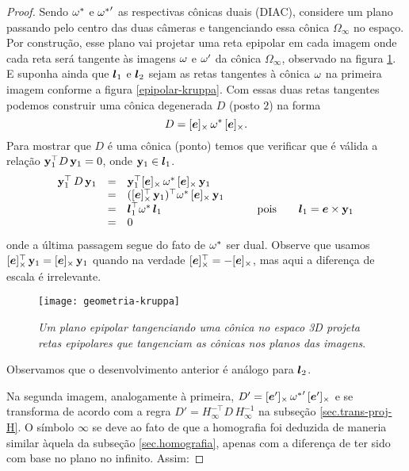 \begin{proof}
 Sendo ${\bf \omega}^*$ e ${{\bf \omega}^*}'$ as respectivas cônicas duais (DIAC), considere um plano passando pelo centro das duas câmeras e tangenciando essa cônica $\Omega_\infty$ no espaço. Por construção, esse plano vai projetar uma reta epipolar em cada imagem onde cada reta será tangente às imagens ${\bf \omega}$ e ${\bf \omega'}$ da cônica $\Omega_\infty$, observado na figura \ref{geometria-kruppa}. E suponha ainda que $\boldsymbol{l}_1$ e $\boldsymbol{l}_2$ sejam as retas tangentes à cônica ${\bf \omega}$ na primeira imagem conforme a figura \ref{epipolar-kruppa}. Com essas duas retas tangentes podemos construir uma cônica degenerada $D$ (posto $2$) na forma  
\begin{equation}\label{eq.def.con.deg}
D=[\boldsymbol{e}]_\times\,{\bf \omega}^*\,[\boldsymbol{e}]_\times. 
\end{equation}
Para mostrar que $D$ é uma cônica (ponto) temos que verificar que é válida a relação ${\bf y}_1^\top D\,{\bf y}_1=0$, onde ${\bf y}_1\in\boldsymbol{l}_1$.
\begin{equation*}
\begin{array}{rcll}
{\bf y}_1^\top\,D\,{\bf y}_1&=&{\bf y}_1^\top [\boldsymbol{e}]_\times\,{\bf \omega}^*\,[\boldsymbol{e}]_\times\,{\bf y}_1&\\
&=&([\boldsymbol{e}]^\top_\times\,{\bf y}_1)^\top {\bf \omega}^*\,[\boldsymbol{e}]_\times\,{\bf y}_1&\\
&=&\boldsymbol{l}_1^\top {\bf \omega}^*\,\boldsymbol{l}_1& \qquad\text{pois}\qquad\boldsymbol{l}_1=\boldsymbol{e}\times{\bf y}_1\\
&=&0&
\end{array}
\end{equation*}
onde a última passagem segue do fato de ${\bf \omega}^*$ ser dual. Observe que usamos $[\boldsymbol{e}]^\top_\times\,{\bf y}_1=[\boldsymbol{e}]_\times\,{\bf y}_1$ quando na verdade $[\boldsymbol{e}]^\top_\times=-[\boldsymbol{e}]_\times$, mas aqui a diferença de escala é irrelevante. 
\begin{figure}[!htb]
\centering
\texttt{[image: geometria-kruppa]}
\caption{\textit{Um plano epipolar tangenciando uma cônica no espaco 3D projeta retas epipolares que tangenciam as cônicas nos planos das imagens}.}
\label{geometria-kruppa}
\end{figure}
Observamos que o desenvolvimento anterior é análogo para $\boldsymbol{l}_2$.

Na segunda imagem, analogamente à primeira, $D'=[\boldsymbol{e}']_\times\,{{\bf \omega}^*}'\,[\boldsymbol{e}']_\times$ e se transforma de acordo com a regra $D'=H_\infty^{-\top}D\,H_\infty^{-1}$ na subseção \ref{sec.trans-proj-H}. O símbolo $\infty$ se deve ao fato de que a homografia foi deduzida de maneria similar àquela da subseção  \ref{sec.homografia}, apenas com a diferença de ter sido com base no plano no infinito. Assim:


\end{proof}
